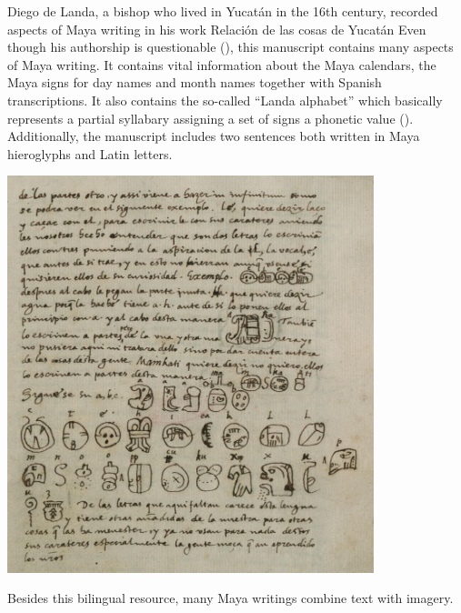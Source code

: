 \documentclass[../main.tex]{subfiles}
\begin{document}
Diego de Landa, a bishop who lived in Yucat\'{a}n in the 16th century, recorded aspects
of Maya writing in his work Relaci\'{o}n de las cosas de Yucat\'{a}n 
Even though his authorship is questionable (\cite{restallchuchiak2002}), this manuscript contains 
many aspects of Maya writing.
It contains vital information about the Maya calendars, the Maya signs for day names and month names
together with Spanish transcriptions.
It also contains the so-called ``Landa alphabet'' which basically represents a 
partial syllabary assigning a set of signs a phonetic value 
().
Additionally, the manuscript includes two sentences both written in Maya hieroglyphs and 
Latin letters.
\begin{center}
    \includegraphics[width=0.8\textwidth,keepaspectratio]{img/landa-relacion-folio-45r}
    \label{fig:terminology-landa-relacion-folio-45r}
\end{center}
Besides this bilingual resource, many Maya writings combine text with imagery.
\end{document}

